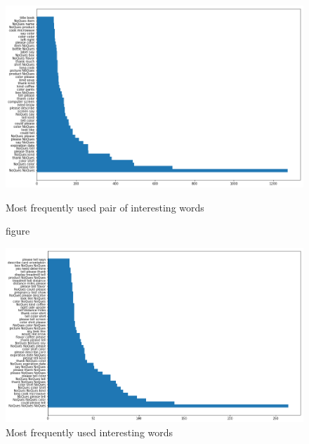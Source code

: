 \documentclass[sigconf]{acmart}
\begin{document}
\begin{figure}[bp]   
    \centering
    
    \includegraphics[scale=0.45]{images/bigram_interesting.png}
    \caption{figure}{Most frequently used pair of interesting words}
     \label{fig:bi_int}   
\end{figure}


\begin{figure}[bp]
        \centering
        \includegraphics[scale=0.5]{images/trigram_interesting.png}  
        \caption{Most frequently used interesting words} 
          \label{fig:tri_int}   
\end{figure}



%
\end{document}
